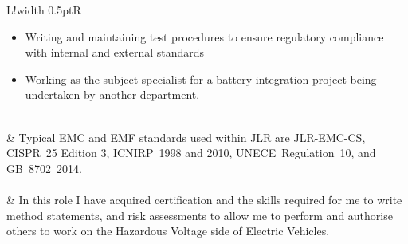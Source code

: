 \documentclass[a4paper]{article}
\newcommand\VRule{\color{lightgray}\vrule width 0.5pt}
\begin{document}
\begin{tabularx}{\textwidth}{L!{\VRule}R}
\begin{itemize}
        \item Writing and maintaining test procedures to ensure regulatory compliance with internal and external standards 
        \item Working as the subject specialist for a battery integration project being undertaken by another department.
    \end{itemize} \\
    & Typical EMC and EMF standards used within JLR are JLR-EMC-CS, CISPR~25 Edition 3, ICNIRP~1998 and 2010, UNECE~Regulation~10, and GB~8702~2014. \\ \\
    & In this role I have acquired certification and the skills required for me to write method statements, and risk assessments to allow me to perform and authorise others to work on the Hazardous Voltage side of Electric Vehicles.\\
\end{tabularx}
\end{document}
